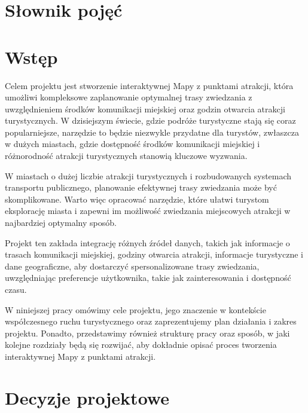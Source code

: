 \documentclass{report}
\begin{document}

	\clearpage

	\chapter{Słownik pojęć}
	\label{ch:slownik-pojec}
	

	\chapter{Wstęp}
	\label{ch:wstep}

	Celem projektu jest stworzenie interaktywnej Mapy z punktami atrakcji, która umożliwi kompleksowe zaplanowanie optymalnej trasy zwiedzania z uwzględnieniem środków komunikacji miejskiej oraz godzin otwarcia atrakcji turystycznych. W dzisiejszym świecie, gdzie podróże turystyczne stają się coraz popularniejsze, narzędzie to będzie niezwykle przydatne dla turystów, zwłaszcza w dużych miastach, gdzie dostępność środków komunikacji miejskiej i różnorodność atrakcji turystycznych stanowią kluczowe wyzwania.

	W miastach o dużej liczbie atrakcji turystycznych i rozbudowanych systemach transportu publicznego, planowanie efektywnej trasy zwiedzania może być skomplikowane. Warto więc opracować narzędzie, które ułatwi turystom eksplorację miasta i zapewni im możliwość zwiedzania miejscowych atrakcji w najbardziej optymalny sposób.

	Projekt ten zakłada integrację różnych źródeł danych, takich jak informacje o trasach komunikacji miejskiej, godziny otwarcia atrakcji, informacje turystyczne i dane geograficzne, aby dostarczyć spersonalizowane trasy zwiedzania, uwzględniając preferencje użytkownika, takie jak zainteresowania i dostępność czasu.

	W niniejszej pracy omówimy cele projektu, jego znaczenie w kontekście współczesnego ruchu turystycznego oraz zaprezentujemy plan działania i zakres projektu. Ponadto, przedstawimy również strukturę pracy oraz sposób, w jaki kolejne rozdziały będą się rozwijać, aby dokładnie opisać proces tworzenia interaktywnej Mapy z punktami atrakcji.

	\chapter{Decyzje projektowe}
	\label{ch:decyzje-projektowe}
	
\end{document}
